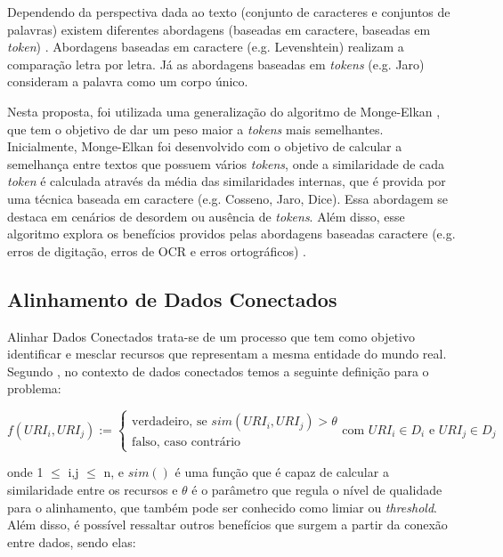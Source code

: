 Dependendo da perspectiva dada ao texto (conjunto de caracteres e conjuntos de palavras) existem diferentes abordagens (baseadas em caractere, baseadas em \textit{token}) \cite{cohen2003comparison}. Abordagens baseadas em caractere (e.g. Levenshtein) realizam a comparação letra por letra. Já as abordagens baseadas em \textit{tokens} (e.g. Jaro) consideram a palavra como um corpo único.

Nesta proposta, foi utilizada uma generalização do algoritmo de Monge-Elkan \cite{monge1996field}, que tem o objetivo de dar um peso maior a \textit{tokens} mais semelhantes. Inicialmente, Monge-Elkan foi desenvolvido com o objetivo de calcular a semelhança entre textos que possuem vários \textit{tokens}, onde a similaridade de cada \textit{token} é calculada através da média das similaridades internas, que é provida por uma técnica baseada em caractere (e.g. Cosseno, Jaro, Dice). Essa abordagem se destaca em cenários de desordem ou ausência de \textit{tokens}. Além disso, esse algoritmo explora os benefícios providos pelas abordagens baseadas caractere (e.g. erros de digitação, erros de OCR e erros ortográficos) \cite{jimenez2009generalized}.

\subsection{Alinhamento de Dados Conectados}

Alinhar Dados Conectados  trata-se de um processo que tem como objetivo identificar e mesclar recursos que representam a mesma entidade do mundo real. Segundo , no contexto de dados conectados temos a seguinte definição para o problema:

\begin{equation}
f\left( { URI }_{ i },{ URI }_{ j } \right) :=\begin{cases} \mbox{verdadeiro, se } sim\left( { URI }_{ i },{ URI }_{ j } \right) >\theta  \\ \mbox{falso, caso contrário} \end{cases}\mbox{com }{ URI }_{ i } \in { D }_{ i }\mbox{ e }{ URI }_{ j } \in { D }_{ j }
\end{equation}

onde 1 $\leq$ i,j $\leq$ n, e $sim()$ é uma função que é capaz de calcular a similaridade entre os recursos e $\theta$ é o parâmetro que regula o nível de qualidade para o alinhamento, que também pode ser conhecido como limiar ou \textit{threshold}. Além disso, é possível ressaltar outros benefícios que surgem a partir da conexão entre dados, sendo elas: 

